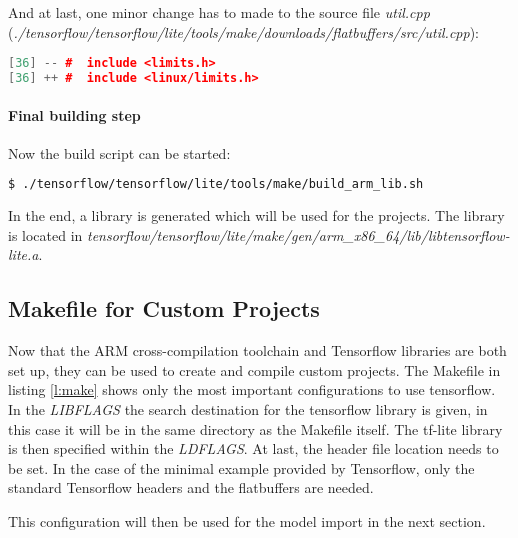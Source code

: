 And at last, one minor change has to made to the source file \textit{util.cpp} (\textit{./tensorflow/tensorflow/lite/tools/make/downloads/flatbuffers/src/util.cpp}):

\begin{lstlisting}[caption={util.cpp}, language=c++]
[36] -- #  include <limits.h>
[36] ++ #  include <linux/limits.h>
\end{lstlisting}

\paragraph*{Final building step} \hfill

Now the build script can be started:

\begin{lstlisting}[caption={build\_arm\_lib.sh}, language=bash]
$ ./tensorflow/tensorflow/lite/tools/make/build_arm_lib.sh
\end{lstlisting}

In the end, a library is generated which will be used for the projects. The library is located in \textit{tensorflow/tensorflow/lite/make/gen/arm\_x86\_64/lib/libtensorflow-lite.a}.


\subsection{Makefile for Custom Projects}
Now that the ARM cross-compilation toolchain and Tensorflow libraries are both set up, they can be used to create and compile custom projects. The Makefile in listing \ref{l:make} shows only the most important configurations to use tensorflow. In the \textit{LIBFLAGS} the search destination for the tensorflow library is given, in this case it will be in the same directory as the Makefile itself. The tf-lite library is then specified within the \textit{LDFLAGS}. At last, the header file location needs to be set. In the case of the minimal example provided by Tensorflow, only the standard Tensorflow headers and the flatbuffers are needed. 

This configuration will then be used for the model import in the next section.

